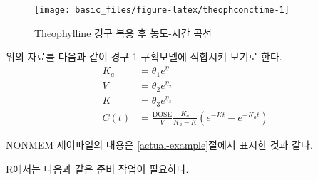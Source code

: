 \documentclass[
  10pt,
  krantz2,
  a4paper]{krantz}
\theoremstyle{definition}
\theoremstyle{definition}
\theoremstyle{definition}
\theoremstyle{remark}
\begin{document}
\begin{figure}
\texttt{[image: basic\_files/figure-latex/theophconctime-1]} \caption{Theophylline 경구 복용 후 농도-시간 곡선}\label{fig:theophconctime}
\end{figure}

위의 자료를 다음과 같이 경구 1 구획모델에 적합시켜 보기로 한다.
\begin{equation}
\begin{split}
  K_{a} & = \theta_{1}e^{\eta_{1}} \\
  V & = \theta_{2}e^{\eta_{2}} \\
  K & = \theta_{3}e^{\eta_{3}} \\
  C(t) & = \frac{\text{DOSE}}{V}\frac{K_{a}}{K_{a} - K}(e^{- Kt} - e^{- K_{a}t})
\end{split}
\label{eq:onecompfit}
\end{equation}

NONMEM 제어파일의 내용은 \ref{actual-example}절에서 표시한 것과 같다.

R에서는 다음과 같은 준비 작업이 필요하다.
\end{document}
